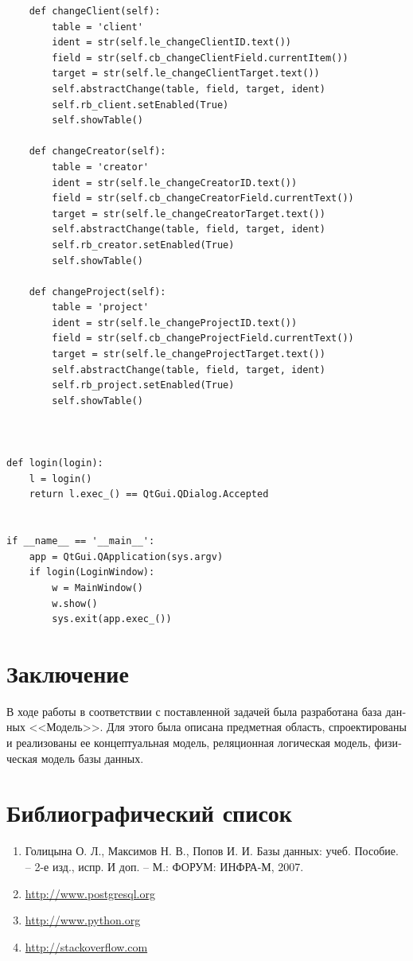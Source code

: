 \documentclass[a4paper, 12pt, titlepage]{article}
\begin{document}
\begin{otherlanguage}{russian}
\begin{lstlisting}
    def changeClient(self):
        table = 'client'
        ident = str(self.le_changeClientID.text())
        field = str(self.cb_changeClientField.currentItem())
        target = str(self.le_changeClientTarget.text())
        self.abstractChange(table, field, target, ident)
        self.rb_client.setEnabled(True)
        self.showTable()

    def changeCreator(self):
        table = 'creator'
        ident = str(self.le_changeCreatorID.text())
        field = str(self.cb_changeCreatorField.currentText())
        target = str(self.le_changeCreatorTarget.text())
        self.abstractChange(table, field, target, ident)
        self.rb_creator.setEnabled(True)
        self.showTable()

    def changeProject(self):
        table = 'project'
        ident = str(self.le_changeProjectID.text())
        field = str(self.cb_changeProjectField.currentText())
        target = str(self.le_changeProjectTarget.text())
        self.abstractChange(table, field, target, ident)
        self.rb_project.setEnabled(True)
        self.showTable()



def login(login):
    l = login()    
    return l.exec_() == QtGui.QDialog.Accepted


if __name__ == '__main__':
    app = QtGui.QApplication(sys.argv)
    if login(LoginWindow):
        w = MainWindow()
        w.show()
        sys.exit(app.exec_())
\end{lstlisting}

\newpage

\section{Заключение}
\par В ходе работы в соответствии с поставленной задачей была разработана база данных <<Модель>>. Для этого была описана предметная область, спроектированы и реализованы ее концептуальная модель, реляционная логическая модель, физическая модель базы данных.
\section{Библиографический список}

\begin{enumerate}
\item Голицына О. Л., Максимов Н. В., Попов И. И. Базы данных: учеб. Пособие. – 2-е изд., испр. И доп. – М.: ФОРУМ: ИНФРА-М, 2007. 
\item \url{http://www.postgresql.org}
\item \url{http://www.python.org}
\item \url{http://stackoverflow.com}
\end{enumerate}


\end{otherlanguage}
\end{document}
